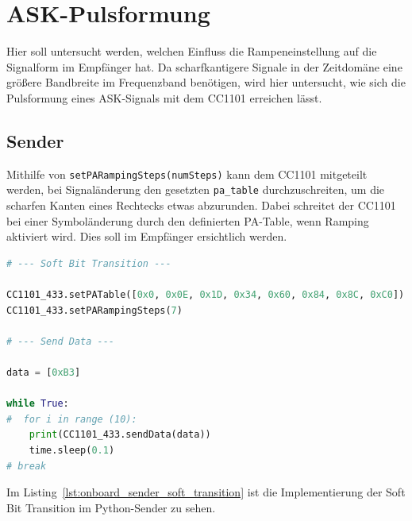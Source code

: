 \newpage
\section{ASK-Pulsformung}



Hier soll untersucht werden, welchen Einfluss die Rampeneinstellung auf die Signalform im Empfänger hat. Da scharfkantigere Signale in der Zeitdomäne eine größere Bandbreite im Frequenzband benötigen, wird hier untersucht, wie sich die Pulsformung eines ASK-Signals mit dem CC1101 erreichen lässt.



\subsection{Sender}
Mithilfe von \lstinline{setPARampingSteps(numSteps)} kann dem CC1101 mitgeteilt werden, bei Signaländerung den gesetzten \lstinline{pa_table} durchzuschreiten, um die scharfen Kanten eines Rechtecks etwas abzurunden.  Dabei schreitet der CC1101 bei einer Symboländerung durch den definierten PA-Table, wenn Ramping aktiviert wird. Dies soll im Empfänger ersichtlich werden.

\begin{lstlisting}[language=Python, caption={Soft Bit Transition in onboard\_sender.py}, label={lst:onboard_sender_soft_transition}]
# --- Soft Bit Transition ---

CC1101_433.setPATable([0x0, 0x0E, 0x1D, 0x34, 0x60, 0x84, 0x8C, 0xC0])
CC1101_433.setPARampingSteps(7)

# --- Send Data ---

data = [0xB3]

while True:
#  for i in range (10):
    print(CC1101_433.sendData(data))
    time.sleep(0.1)
# break
\end{lstlisting}

Im Listing~\ref{lst:onboard_sender_soft_transition} ist die Implementierung der Soft Bit Transition im Python-Sender zu sehen.


